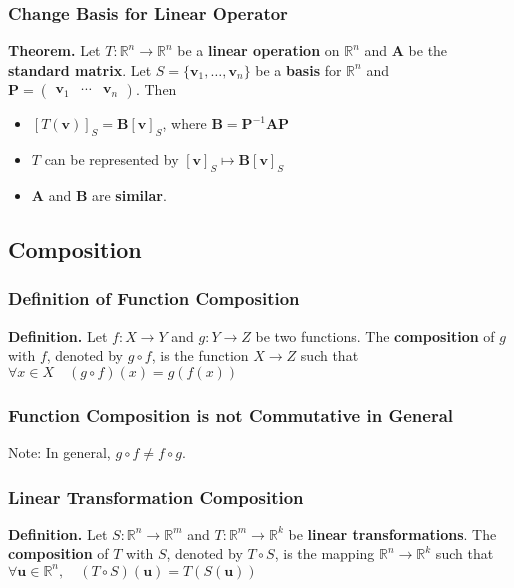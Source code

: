\documentclass[../ma2001_notes.tex]{subfiles}
\begin{document}
\subsubsection{Change Basis for Linear Operator}
\textbf{Theorem.} Let \(T:\mathbb{R}^n\to\mathbb{R}^n\) be a \textbf{linear operation} on \(\mathbb{R}^n\) and \(\bm{A}\) be the \textbf{standard matrix}. Let \(S=\{\bm{v}_1,\ldots,\bm{v}_n\}\) be a \textbf{basis} for \(\mathbb{R}^n\) and \(\bm{P}=\begin{pmatrix}
	\bm{v}_1 & \cdots & \bm{v}_n
\end{pmatrix}\). Then
\begin{itemize}
	\item\([T(\bm{v})]_S=\bm{B}[\bm{v}]_S\), where \(\bm{B}=\bm{P}^{-1}\bm{AP}\)
	\item\(T\) can be represented by \([\bm{v}]_S\mapsto\bm{B}[\bm{v}]_S\)
	\item\(\bm{A}\) and \(\bm{B}\) are \textbf{similar}.
\end{itemize}

\subsection{Composition}
\subsubsection{Definition of Function Composition}
\textbf{Definition.} Let \(f:X\to Y\) and \(g:Y\to Z\) be two functions. The \textbf{composition} of \(g\) with \(f\), denoted by \(g\circ f\), is the function \(X\to Z\) such that \(\forall x\in X\quad (g\circ f)(x)=g(f(x))\)

\subsubsection{Function Composition is not Commutative in General}
Note: In general, \(g\circ f\ne f\circ g\).

\subsubsection{Linear Transformation Composition}
\textbf{Definition.} Let \(S:\mathbb{R}^n\to\mathbb{R}^m\) and \(T:\mathbb{R}^m\to\mathbb{R}^k\) be \textbf{linear transformations}. The \textbf{composition} of \(T\) with \(S\), denoted by \(T\circ S\), is the mapping \(\mathbb{R}^n\to\mathbb{R}^k\) such that \(\forall\bm{u}\in\mathbb{R}^n,\quad(T\circ S)(\bm{u})=T(S(\bm{u}))\)
\end{document}
